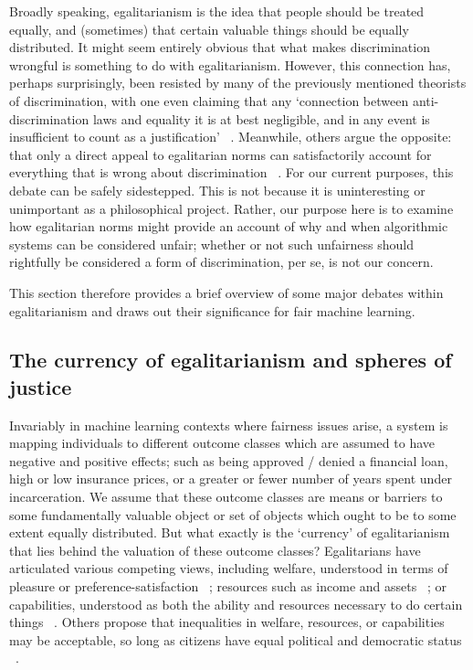 \documentclass[pmlr,twocolumn,10pt]{jmlr}%
\begin{document}
Broadly speaking, egalitarianism is the idea that people should be treated equally, and (sometimes) that certain valuable things should be equally distributed. It might seem entirely obvious that what makes discrimination wrongful is something to do with egalitarianism. However, this connection has, perhaps surprisingly, been resisted by many of the previously mentioned theorists of discrimination, with one even claiming that any `connection between anti-discrimination laws and equality it is at best negligible, and in any event is insufficient to count as a justification' ~\cite{holmes2005anti}. Meanwhile, others argue the opposite: that only a direct appeal to egalitarian norms can satisfactorily account for everything that is wrong about discrimination ~\cite{segall2012s}. For our current purposes, this debate can be safely sidestepped. This is not because it is uninteresting or unimportant as a philosophical project. Rather, our purpose here is to examine how egalitarian norms might provide an account of why and when algorithmic systems can be considered unfair; whether or not such unfairness should rightfully be considered a form of discrimination, per se, is not our concern.


This section therefore provides a brief overview of some major debates within egalitarianism and draws out their significance for fair machine learning. 

\subsection{The currency of egalitarianism and spheres of justice}

Invariably in machine learning contexts where fairness issues arise, a system is mapping individuals to different outcome classes which are assumed to have negative and positive effects; such as being approved / denied a financial loan, high or low insurance prices, or a greater or fewer number of years spent under incarceration. We assume that these outcome classes are means or barriers to some fundamentally valuable object or set of objects which ought to be to some extent equally distributed. But what exactly is the `currency' of egalitarianism that lies behind the valuation of these outcome classes? Egalitarians have articulated various competing views, including welfare, understood in terms of pleasure or preference-satisfaction ~\cite{cohen1989currency}; resources such as income and assets ~\cite{rawls2009theory,dworkin1981equality}; or capabilities, understood as both the ability and resources necessary to do certain things ~\cite{sen1992inequality}. Others propose that inequalities in welfare, resources, or capabilities may be acceptable, so long as citizens have equal political and democratic status ~\cite{anderson1999point}.
\end{document}
